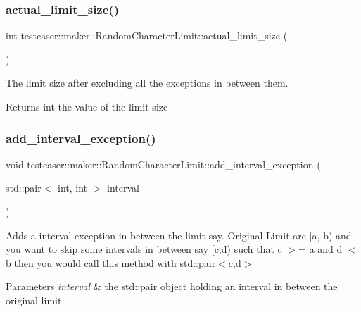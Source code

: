\subsubsection{\texorpdfstring{actual\_limit\_size()}{actual\_limit\_size()}}
{\footnotesize\ttfamily int testcaser\+::maker\+::\+Random\+Character\+Limit\+::actual\+\_\+limit\+\_\+size (\begin{DoxyParamCaption}{ }\end{DoxyParamCaption})\hspace{0.3cm}{\ttfamily [inline]}}



The limit size after excluding all the exceptions in between them. 

\begin{DoxyReturn}{Returns}
int the value of the limit size 
\end{DoxyReturn}
\mbox{\label{classtestcaser_1_1maker_1_1RandomCharacterLimit_a9fac35205a15685a2ce671f9f38279ab}} 
\subsubsection{\texorpdfstring{add\_interval\_exception()}{add\_interval\_exception()}}
{\footnotesize\ttfamily void testcaser\+::maker\+::\+Random\+Character\+Limit\+::add\+\_\+interval\+\_\+exception (\begin{DoxyParamCaption}\item[{std\+::pair$<$ int, int $>$}]{interval }\end{DoxyParamCaption})\hspace{0.3cm}{\ttfamily [inline]}}



Adds a interval exception in between the limit say. Original Limit are \mbox{[}a, b) and you want to skip some intervals in between say \mbox{[}c,d) such that c $>$= a and d $<$ b then you would call this method with std\+::pair$<$c,d$>$ 


\begin{DoxyParams}{Parameters}
{\em interval} & the std\+::pair object holding an interval in between the original limit. \\
\hline
\end{DoxyParams}
\mbox{\label{classtestcaser_1_1maker_1_1RandomCharacterLimit_a4519263daf2737941039054c60c26ca5}} 
